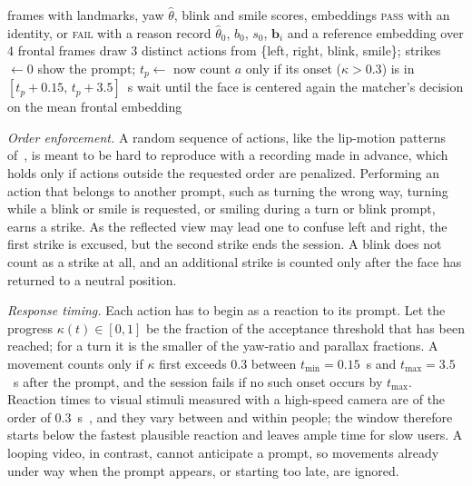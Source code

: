 \documentclass{ieeeaccess}
\begin{document}
\begin{algorithm}[!t]
\caption{Face-unlock liveness session}\label{alg:live}
\footnotesize
\begin{algorithmic}[1]
\Require frames with landmarks, yaw $\hat\theta$, blink and smile scores, embeddings
\Ensure \textsc{pass} with an identity, or \textsc{fail} with a reason
\State record $\hat\theta_0$, $b_0$, $s_0$, $\mathbf{b}_i$ and a reference embedding over 4 frontal frames
\State draw 3 distinct actions from \{left, right, blink, smile\}; strikes $\gets 0$
  \State show the prompt; $t_p\gets$ now
  \Repeat
    \State count $a$ only if its onset ($\kappa>0.3$) is in $[t_p{+}0.15,\,t_p{+}3.5]$~s
  \State wait until the face is centered again
\EndFor
\State \Return the matcher's decision on the mean frontal embedding
\end{algorithmic}
\end{algorithm}

\emph{Order enforcement.} A random sequence of actions, like the lip-motion patterns of~\cite{zhou2024lipmotion}, is meant to be hard to reproduce with a recording made in advance, which holds only if actions outside the requested order are penalized. Performing an action that belongs to another prompt, such as turning the wrong way, turning while a blink or smile is requested, or smiling during a turn or blink prompt, earns a strike. As the reflected view may lead one to confuse left and right, the first strike is excused, but the second strike ends the session. A blink does not count as a strike at all, and an additional strike is counted only after the face has returned to a neutral position.

\emph{Response timing.} Each action has to begin as a reaction to its prompt. Let the progress $\kappa(t)\in[0,1]$ be the fraction of the acceptance threshold that has been reached; for a turn it is the smaller of the yaw-ratio and parallax fractions. A movement counts only if $\kappa$ first exceeds 0.3 between $t_{\min}=0.15$~s and $t_{\max}=3.5$~s after the prompt, and the session fails if no such onset occurs by $t_{\max}$. Reaction times to visual stimuli measured with a high-speed camera are of the order of 0.3~s~\cite{tatsuno2016reaction}, and they vary between and within people; the window therefore starts below the fastest plausible reaction and leaves ample time for slow users. A looping video, in contrast, cannot anticipate a prompt, so movements already under way when the prompt appears, or starting too late, are ignored.
\end{document}
